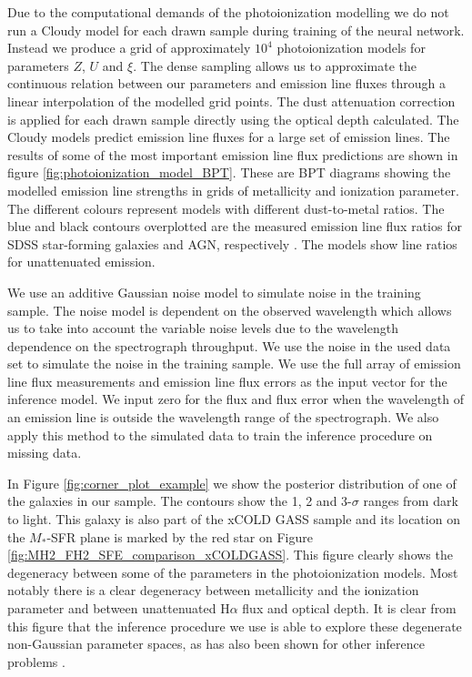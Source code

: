 \documentclass[fleqn,usenatbib]{mnras}
\begin{document}
Due to the computational demands of the photoionization modelling we do not run a Cloudy model for each drawn sample during training of the neural network. Instead we produce a grid of approximately $10^{4}$ photoionization models for parameters $Z$, $U$ and $\xi$. The dense sampling allows us to approximate the continuous relation between our parameters and emission line fluxes through a linear interpolation of the modelled grid points. The dust attenuation correction is applied for each drawn sample directly using the optical depth calculated. The Cloudy models predict emission line fluxes for a large set of emission lines. The results of some of the most important emission line flux predictions are shown in figure \ref{fig:photoionization_model_BPT}. These are BPT diagrams \citep{baldwin1981} showing the modelled emission line strengths in grids of metallicity and ionization parameter. The different colours represent models with different dust-to-metal ratios. The blue and black contours overplotted are the measured emission line flux ratios for SDSS star-forming galaxies and AGN, respectively \citep{brinchmann2004, kauffmann2003, tremonti2004}. The models show line ratios for unattenuated emission.

We use an additive Gaussian noise model to simulate noise in the training sample. The noise model is dependent on the observed wavelength which allows us to take into account the variable noise levels due to the wavelength dependence on the spectrograph throughput. We use the noise in the used data set to simulate the noise in the training sample. We use the full array of emission line flux measurements and emission line flux errors as the input vector for the inference model. We input zero for the flux and flux error when the wavelength of an emission line is outside the wavelength range of the spectrograph. We also apply this method to the simulated data to train the inference procedure on missing data. 

In Figure \ref{fig:corner_plot_example} we show the posterior distribution of one of the galaxies in our sample. The contours show the 1, 2 and 3-$\sigma$ ranges from dark to light. This galaxy is also part of the xCOLD GASS sample and its location on the $M_{*}$-SFR plane is marked by the red star on Figure \ref{fig:MH2_FH2_SFE_comparison_xCOLDGASS}. This figure clearly shows the degeneracy between some of the parameters in the photoionization models. Most notably there is a clear degeneracy between metallicity and the ionization parameter and between unattenuated H$\alpha$ flux and optical depth. It is clear from this figure that the inference procedure we use is able to explore these degenerate non-Gaussian parameter spaces, as has also been shown for other inference problems \citep{greenberg2019}.
\end{document}
